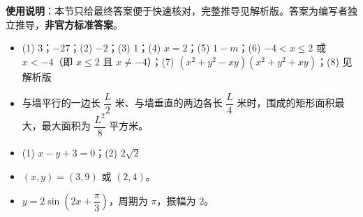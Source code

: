 
\begin{gknotice}
\textbf{使用说明}：本节只给最终答案便于快速核对，完整推导见解析版。答案为编写者独立推导，\textbf{非官方标准答案}。
\end{gknotice}

\begin{itemize}[leftmargin=2.6em]
  \item[\textbf{1.}] (1) $3$；$-27$；(2) $-2$；(3) $1$；(4) $x=2$；(5) $1-m$；(6) $-4<x\leqslant 2$ 或 $x<-4$（即 $x\leqslant 2$ 且 $x\ne-4$）；(7) $(x^2+y^2-xy)(x^2+y^2+xy)$；(8) 见解析版
  \item[\textbf{2.}] 与墙平行的一边长 $\dfrac{L}{2}$ 米、与墙垂直的两边各长 $\dfrac{L}{4}$ 米时，围成的矩形面积最大，最大面积为 $\dfrac{L^2}{8}$ 平方米。
  \item[\textbf{3.}] (1) $x-y+3=0$；(2) $2\sqrt2$
  \item[\textbf{4.}] $(x,y)=(3,9)$ 或 $(2,4)$。
  \item[\textbf{5.}] $y=2\sin\left(2x+\dfrac{\pi}{3}\right)$，周期为 $\pi$，振幅为 $2$。
\end{itemize}
